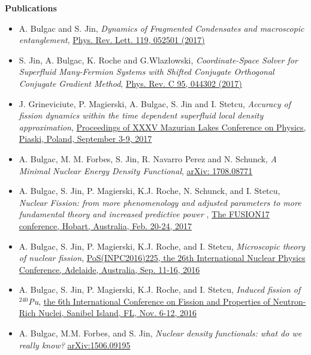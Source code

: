 \documentclass[letterpaper,12pt]{article}
\newcommand{\resheading}[1]{{\large \colorbox{mygrey}{\begin{minipage}{\textwidth}{\textbf{#1 \vphantom{p\^{E}}}}\end{minipage}}}}
\begin{document}


\resheading{Publications}
\fontsize{10}{12}\selectfont

\begin{itemize}
\itemsep0em
\item
A. Bulgac and S. Jin, \textit{Dynamics of Fragmented Condensates and macroscopic entanglement},  \href{https://journals.aps.org/prl/abstract/10.1103/PhysRevLett.119.052501}{Phys. Rev. Lett. 119, 052501 (2017)}


\item
S. Jin, A. Bulgac, K. Roche and G.Wlaz\l{}owski, \textit{Coordinate-Space Solver for Superfluid Many-Fermion Systems with Shifted Conjugate Orthogonal Conjugate Gradient Method}, \href{https://journals.aps.org/prc/abstract/10.1103/PhysRevC.95.044302}{Phys. Rev. C 95, 044302 (2017)}

\item
J. Grineviciute, P. Magierski, A. Bulgac, S. Jin and I. Stetcu, \textit{Accuracy of fission dynamics within the time dependent superfluid local density approximation}, \href{https://arxiv.org/abs/1711.02169}{Proceedings of XXXV Mazurian Lakes Conference on Physics, Piaski, Poland, September 3-9, 2017}

\item
A. Bulgac, M. M. Forbes, S. Jin, R. Navarro Perez and N. Schunck, \textit{A Minimal Nuclear Energy Density Functional}, \href{https://arxiv.org/abs/1708.08771}{arXiv: 1708.08771}

\item
A. Bulgac, S. Jin, P. Magierski, K.J. Roche, N. Schunck, and I. Stetcu, \textit{Nuclear Fission: from more phenomenology and adjusted parameters to more fundamental theory and increased predictive power }, \href{https://www.epj-conferences.org/articles/epjconf/abs/2017/32/epjconf_fusion2017_00007/epjconf_fusion2017_00007.html}{ The FUSION17 conference, Hobart, Australia, Feb. 20-24, 2017}

\item
A. Bulgac, S. Jin, P. Magierski, K.J. Roche, and I. Stetcu, \textit{Microscopic theory of nuclear fission}, \href{https://pos.sissa.it/cgi-bin/reader/contribution.cgi?id=281/225}{PoS(INPC2016)225, the 26th International Nuclear Physics Conference, Adelaide, Australia, Sep. 11-16, 2016}

\item
A. Bulgac, S. Jin, P. Magierski, K.J. Roche, and I. Stetcu, \textit{Induced fission of $^{240}$Pu}, \href{https://arxiv.org/abs/1702.08490}{the 6th International Conference on Fission and Properties of Neutron-Rich Nuclei, Sanibel Island, FL, Nov. 6-12, 2016}


\item
A. Bulgac, M.M. Forbes, and S. Jin, \textit{Nuclear density functionals: what do we really know?} \href{http://arxiv.org/abs/1506.09195}{ arXiv:1506.09195}

\end{itemize}
\end{document}
